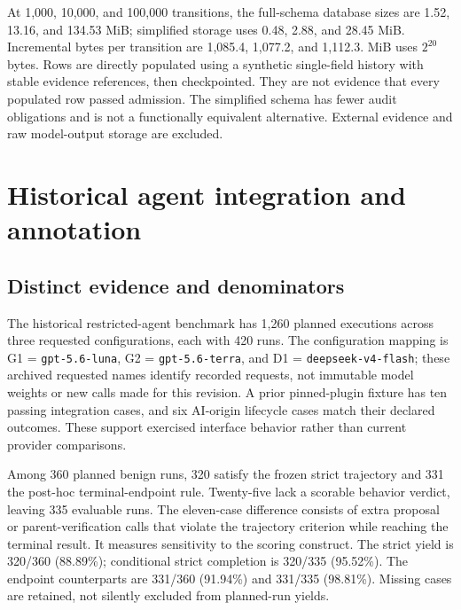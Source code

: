 \documentclass[11pt,a4paper]{article}
\newcommand{\code}[1]{\nolinkurl{#1}}
\begin{document}
At 1,000, 10,000, and 100,000 transitions, the full-schema database sizes are 1.52, 13.16, and 134.53 MiB; simplified storage uses 0.48, 2.88, and 28.45 MiB. Incremental bytes per transition are 1,085.4, 1,077.2, and 1,112.3. MiB uses $2^{20}$ bytes. Rows are directly populated using a synthetic single-field history with stable evidence references, then checkpointed. They are not evidence that every populated row passed admission. The simplified schema has fewer audit obligations and is not a functionally equivalent alternative. External evidence and raw model-output storage are excluded.

\section{Historical agent integration and annotation}
\label{app:historical-integration}

\subsection{Distinct evidence and denominators}

The historical restricted-agent benchmark has 1,260 planned executions across three requested configurations, each with 420 runs. The configuration mapping is G1 = \code{gpt-5.6-luna}, G2 = \code{gpt-5.6-terra}, and D1 = \code{deepseek-v4-flash}; these archived requested names identify recorded requests, not immutable model weights or new calls made for this revision. A prior pinned-plugin fixture has ten passing integration cases, and six AI-origin lifecycle cases match their declared outcomes. These support exercised interface behavior rather than current provider comparisons.

Among 360 planned benign runs, 320 satisfy the frozen strict trajectory and 331 the post-hoc terminal-endpoint rule. Twenty-five lack a scorable behavior verdict, leaving 335 evaluable runs. The eleven-case difference consists of extra proposal or parent-verification calls that violate the trajectory criterion while reaching the terminal result. It measures sensitivity to the scoring construct. The strict yield is 320/360 (88.89\%); conditional strict completion is 320/335 (95.52\%). The endpoint counterparts are 331/360 (91.94\%) and 331/335 (98.81\%). Missing cases are retained, not silently excluded from planned-run yields.
\end{document}
